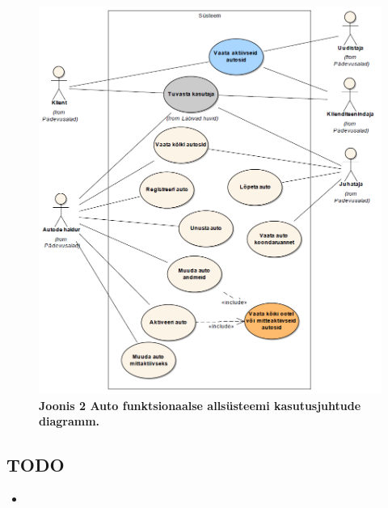 \documentclass{report}
\begin{document}
\begin{figure}[H]
	\includegraphics[scale=0.6]{joonis2}
	\caption{\textbf{Joonis 2 Auto funktsionaalse allsüsteemi kasutusjuhtude diagramm.}}
\end{figure}

\subsection{TODO}
\begin{itemize}
	\item 
\end{itemize}

\end{document}
